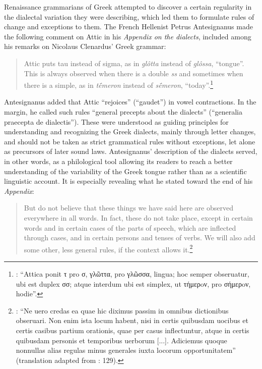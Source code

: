 Renaissance grammarians of Greek attempted to discover a certain regularity in the dialectal variation they were describing, which led them to formulate rules of change and exceptions to them. The French Hellenist Petrus Antesignanus made the following comment on Attic in his \textit{Appendix on the dialects}, included among his remarks on Nicolaus Clenardus’ Greek grammar:

\begin{quote}
Attic puts tau instead of sigma, as in \textit{glôtta} instead of \textit{glôssa}, “tongue”. This is always observed when there is a double \textit{ss} and sometimes when there is a simple, as in \textit{tḗmeron} instead of \textit{sḗmeron}, “today”.\footnote{{\citet[13]{Antesignanus1554}: “Attica ponit τ pro σ, γλῶττα, pro γλῶσσα, lingua; hoc semper obseruatur, ubi est duplex σσ; atque interdum ubi est simplex, ut τήμερoν, pro σήμερoν, hodie”.}}
\end{quote}

Antesignanus added that Attic “rejoices” (“gaudet”) in vowel contractions. In the margin, he called such rules “general precepts about the dialects” (“generalia praecepta de dialectis”). These were understood as guiding principles for understanding and recognizing the Greek dialects, mainly through letter changes, and should not be taken as strict grammatical rules without exceptions, let alone as precursors of later sound laws. Antesignanus’ description of the dialects served, in other words, as a philological tool allowing its readers to reach a better understanding of the variability of the Greek tongue rather than as a scientific linguistic account. It is especially revealing what he stated toward the end of his \textit{Appendix}:

\begin{quote}
But do not believe that these things we have said here are observed everywhere in all words. In fact, these do not take place, except in certain words and in certain cases of the parts of speech, which are inflected through cases, and in certain persons and tenses of verbs. We will also add some other, less general rules, if the context allows it.\footnote{{\citet[15]{Antesignanus1554}: “Ne uero credas ea quae hic diximus passim in omnibus dictionibus obseruari. Non enim ista locum habent, nisi in certis quibusdam uocibus et certis casibus partium orationis, quae per casus inflectuntur, atque in certis quibusdam personis et temporibus uerborum [...]. Adiciemus quoque nonnullas alias regulas minus generales iuxta locorum opportunitatem” (translation adapted from \citealt{VanRooy2016c}: 129).}}
\end{quote}

